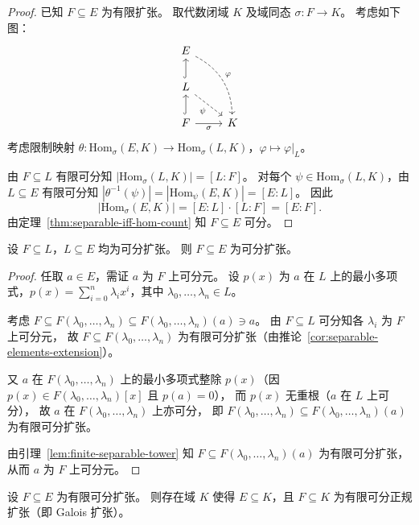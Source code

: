 \documentclass[lang=cn,a4paper,newtx]{elegantbook}
\begin{document}
\begin{proof}
  已知 $F\subseteq E$ 为有限扩张。
  取代数闭域 $K$ 及域同态 $\sigma\colon F\to K$。
  考虑如下图：
  \[
    \begin{tikzcd}
      E \arrow[ddr,bend left,dashed,"\varphi"] \\
      L \arrow[u,hook] \arrow[dr,dashed,"\psi"'] \\
      F \arrow[u,hook] \arrow[r,"\sigma"'] & K
    \end{tikzcd}
  \]
  考虑限制映射 $\theta\colon\mathrm{Hom}_{\sigma}(E,K)\to\mathrm{Hom}_{\sigma}(L,K)$，$\varphi\mapsto\varphi\big|_L$。

  由 $F\subseteq L$ 有限可分知 $|\mathrm{Hom}_{\sigma}(L,K)|=[L:F]$。
  对每个 $\psi\in\mathrm{Hom}_{\sigma}(L,K)$，由 $L\subseteq E$ 有限可分知
  $|\theta^{-1}(\psi)|=|\mathrm{Hom}_{\psi}(E,K)|=[E:L]$。
  因此
  \[
    |\mathrm{Hom}_{\sigma}(E,K)|=[E:L]\cdot[L:F]=[E:F].
  \]
  由定理~\ref{thm:separable-iff-hom-count} 知 $F\subseteq E$ 可分。
\end{proof}

\begin{theorem}
  设 $F\subseteq L$，$L\subseteq E$ 均为可分扩张。
  则 $F\subseteq E$ 为可分扩张。
\end{theorem}

\begin{proof}
  任取 $a\in E$，需证 $a$ 为 $F$ 上可分元。
  设 $p(x)$ 为 $a$ 在 $L$ 上的最小多项式，$p(x)=\sum_{i=0}^{n}\lambda_i x^i$，其中 $\lambda_0,\dots,\lambda_n\in L$。

  考虑 $F\subseteq F(\lambda_0,\dots,\lambda_n)\subseteq F(\lambda_0,\dots,\lambda_n)(a)\ni a$。
  由 $F\subseteq L$ 可分知各 $\lambda_i$ 为 $F$ 上可分元，
  故 $F\subseteq F(\lambda_0,\dots,\lambda_n)$ 为有限可分扩张（由推论~\ref{cor:separable-elements-extension}）。

  又 $a$ 在 $F(\lambda_0,\dots,\lambda_n)$ 上的最小多项式整除 $p(x)$（因 $p(x)\in F(\lambda_0,\dots,\lambda_n)[x]$ 且 $p(a)=0$），
  而 $p(x)$ 无重根（$a$ 在 $L$ 上可分），
  故 $a$ 在 $F(\lambda_0,\dots,\lambda_n)$ 上亦可分，
  即 $F(\lambda_0,\dots,\lambda_n)\subseteq F(\lambda_0,\dots,\lambda_n)(a)$ 为有限可分扩张。

  由引理~\ref{lem:finite-separable-tower} 知 $F\subseteq F(\lambda_0,\dots,\lambda_n)(a)$ 为有限可分扩张，
  从而 $a$ 为 $F$ 上可分元。
\end{proof}

\begin{lemma}\label{normal-closure-2}
  设 $F\subseteq E$ 为有限可分扩张。
  则存在域 $K$ 使得 $E\subseteq K$，且 $F\subseteq K$ 为有限可分正规扩张（即 Galois 扩张）。
\end{lemma}
\end{document}
